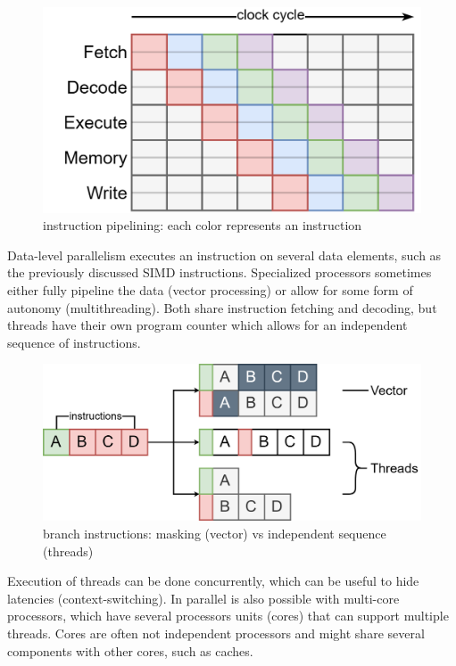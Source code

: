 \documentclass{article}
\begin{document}
\begin{figure}[ht]
    \centering
    \includegraphics[scale=0.2]{instructionlevelparallelism}
    \caption{ instruction pipelining: each color represents an instruction }
\end{figure}

Data-level parallelism executes an instruction on several data elements, such as the previously discussed SIMD instructions.
Specialized processors sometimes either fully pipeline the data (vector processing) or allow for some form of autonomy (multithreading). 
Both share instruction fetching and decoding, but threads have their own program counter which allows for an independent sequence of instructions.

\begin{figure}[ht]
    \centering
    \includegraphics[scale=0.2]{vectorvsthreads}
    \caption{ branch instructions: masking (vector) vs independent sequence (threads)}
\end{figure}

Execution of threads can be done concurrently, which can be useful to hide latencies (context-switching).
In parallel is also possible with multi-core processors, which have several processors units (cores) that can support multiple threads.
Cores are often not independent processors and might share several components with other cores, such as caches\cite{thread-level-parallelism}.
\end{document}
